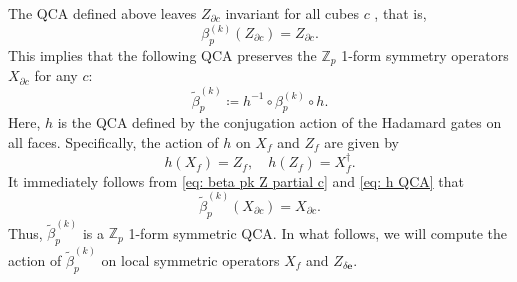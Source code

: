 \documentclass[aps,twocolumn,prx,floatfix,preprintnumbers, nofootinbib,10pt]{revtex4-2}
\numberwithin{equation}{section}
\theoremstyle{definition}
\theoremstyle{remark}
\theoremstyle{claim}
\begin{document}
The QCA defined above leaves $Z_{\partial c}$ invariant for all cubes $c$ \cite{MengSun2026}, that is,
\begin{equation}
\beta_{p}^{(k)}(Z_{\partial c}) = Z_{\partial c}.
\label{eq: beta pk Z partial c}
\end{equation}
This implies that the following QCA preserves the $\mathbb{Z}_p$ 1-form symmetry operators $X_{\partial c}$ for any $c$:
\begin{equation}
\tilde{\beta}_p^{(k)} \coloneq h^{-1} \circ \beta_p^{(k)} \circ h.
\label{eq: tilde beta pk def}
\end{equation}
Here, $h$ is the QCA defined by the conjugation action of the Hadamard gates on all faces.
Specifically, the action of $h$ on $X_f$ and $Z_f$ are given by
\begin{equation}
h(X_f) = Z_f, \quad
h(Z_f) = X_f^{\dagger}.
\label{eq: h QCA}
\end{equation}
It immediately follows from \eqref{eq: beta pk Z partial c} and \eqref{eq: h QCA} that
\begin{equation}
\tilde{\beta}_p^{(k)}(X_{\partial c}) = X_{\partial c}.
\label{eq: beta X partial c}
\end{equation}
Thus, $\tilde{\beta}_p^{(k)}$ is a $\mathbb{Z}_p$ 1-form symmetric QCA.
In what follows, we will compute the action of $\tilde{\beta}_p^{(k)}$ on local symmetric operators $X_f$ and $Z_{\delta \bm{e}}$.
\end{document}
